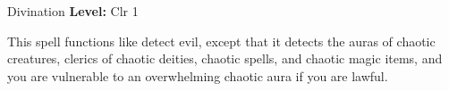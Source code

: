 {Divination}
{
	\textbf{Level:}
	Clr 1\\
}
{
	This spell functions like detect evil, except that it detects the auras of chaotic creatures, clerics of chaotic deities, chaotic spells, and chaotic magic items, and you are vulnerable to an overwhelming chaotic aura if you are lawful.

}
